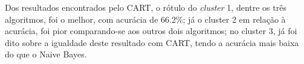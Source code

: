 Dos resultados encontrados pelo CART, o rótulo do \textit{cluster} 1, dentre os três algoritmos, foi o melhor, com acurácia de 66.2\%; já o cluster 2 em relação à acurácia, foi pior comparando-se aos outros dois algoritmos; no cluster 3, já foi dito sobre a igualdade deste resultado com CART, tendo a acurácia mais baixa do que o Naive Bayes. 

% 
% 
%   
